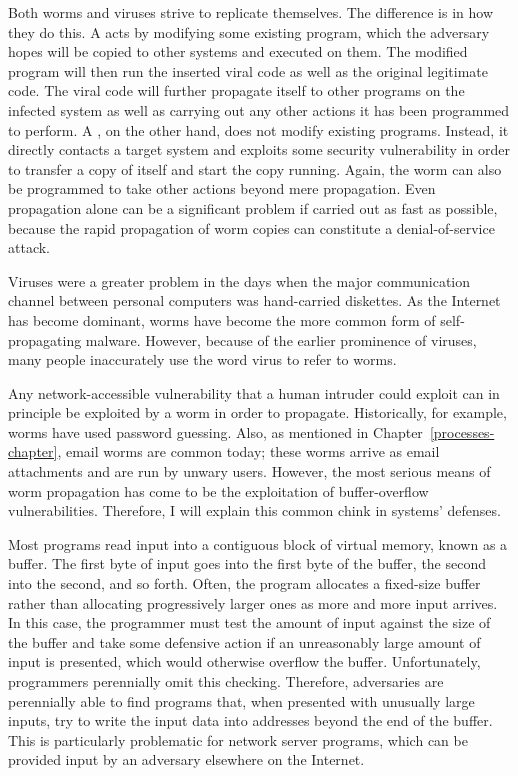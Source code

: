 Both worms and viruses strive to replicate themselves.  The difference
is in how they do this.  A  acts by modifying some
existing program, which the adversary hopes will be copied to other
systems and executed on them.  The modified program will then run the
inserted viral code as well as the original legitimate code.  The
viral code will further propagate itself to other programs on the
infected system as well as carrying out any other actions it has been
programmed to perform.  A , on the other hand, does not
modify existing programs.  Instead, it directly contacts a target
system and exploits some security vulnerability in order to transfer
a copy of itself and start the copy running.  Again, the worm can also
be programmed to take other actions beyond mere propagation.  Even
propagation alone can be a significant problem if carried out as fast
as possible, because the rapid propagation of worm copies can
constitute a denial-of-service attack.

Viruses were a greater problem in the days when the major
communication channel between personal computers was hand-carried
diskettes.  As the Internet has become dominant, worms have become the
more common form of self-propagating malware.  However, because of the
earlier prominence of viruses, many people inaccurately use the word
virus to refer to worms.

Any network-accessible vulnerability that a human intruder could
exploit can in principle be exploited by a worm in order to
propagate.  Historically, for example, worms have used password
guessing.  Also, as mentioned in Chapter~\ref{processes-chapter},
email worms are common today; these worms arrive as email
attachments and are run by unwary users.  However, the most serious
means of worm propagation has come to be the exploitation of
buffer-overflow vulnerabilities.  Therefore, I will explain this
common chink in systems' defenses.

Most programs read input into a contiguous block of virtual memory,
known as a buffer.  The first byte of input goes into the first byte
of the buffer, the second into the second, and so forth.  Often, the
program allocates a fixed-size buffer rather than allocating
progressively larger ones as more and more input arrives.  In this
case, the programmer must test the amount of input against the size of
the buffer and take some defensive action if an unreasonably large
amount of input is presented, which would otherwise overflow the
buffer.  Unfortunately, programmers perennially omit this
checking. Therefore, adversaries are perennially able to find programs
that, when presented with unusually large inputs, try to write the
input data into addresses beyond the end of the buffer.  This is
particularly problematic for network server programs, which can be
provided input by an adversary elsewhere on the Internet.

